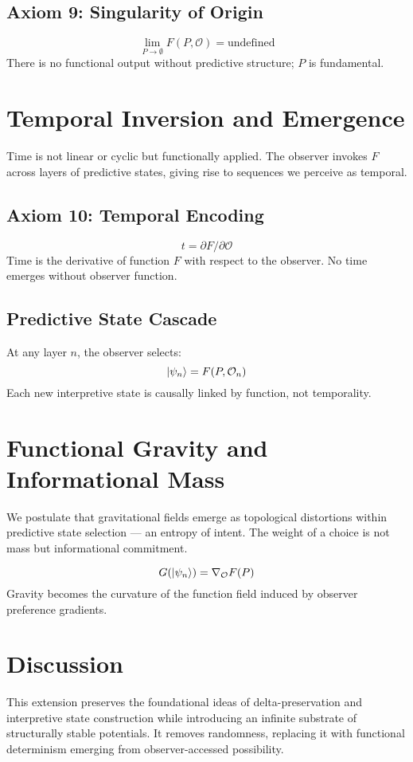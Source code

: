 \documentclass[12pt]{article}
\begin{document}
\subsection*{Axiom 9: Singularity of Origin}
\[
\lim_{P \to \emptyset} F(P, \mathcal{O}) = \text{undefined}
\]
There is no functional output without predictive structure; $P$ is fundamental.

\section{Temporal Inversion and Emergence}
Time is not linear or cyclic but functionally applied. The observer invokes $F$ across layers of predictive states, giving rise to sequences we perceive as temporal.

\subsection*{Axiom 10: Temporal Encoding}
\[
t = \partial F / \partial \mathcal{O}
\]
Time is the derivative of function $F$ with respect to the observer. No time emerges without observer function.

\subsection*{Predictive State Cascade}
At any layer $n$, the observer selects:
\[
\ket{\psi_n} = F(P, \mathcal{O}_n)
\]
Each new interpretive state is causally linked by function, not temporality.

\section{Functional Gravity and Informational Mass}
We postulate that gravitational fields emerge as topological distortions within predictive state selection — an entropy of intent. The weight of a choice is not mass but informational commitment.

\[
G(\ket{\psi_n}) = \nabla_{\mathcal{O}} F(P)
\]
Gravity becomes the curvature of the function field induced by observer preference gradients.

\section{Discussion}
This extension preserves the foundational ideas of delta-preservation and interpretive state construction while introducing an infinite substrate of structurally stable potentials. It removes randomness, replacing it with functional determinism emerging from observer-accessed possibility.
\end{document}
